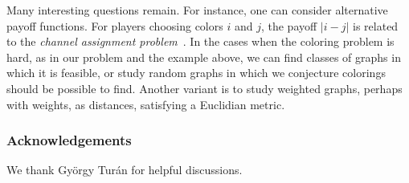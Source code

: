 \documentclass{llncs}
\begin{document}
Many interesting questions remain.  For instance, one can consider alternative payoff functions. For players
choosing colors $i$ and $j$, the payoff $|i-j|$ is related to the \emph{channel assignment problem}~\cite{vandenHeuvel98}.
In the cases when the coloring problem is hard, as in our problem and the example above,
we can find classes of graphs in which it is feasible, or study random graphs in which
we conjecture colorings should be possible to find.
Another variant is to study weighted graphs, perhaps with weights, as distances, 
satisfying a Euclidian metric.

\subsubsection*{Acknowledgements}

We thank Gy\"{o}rgy Tur\'{a}n for helpful discussions.




\end{document}
